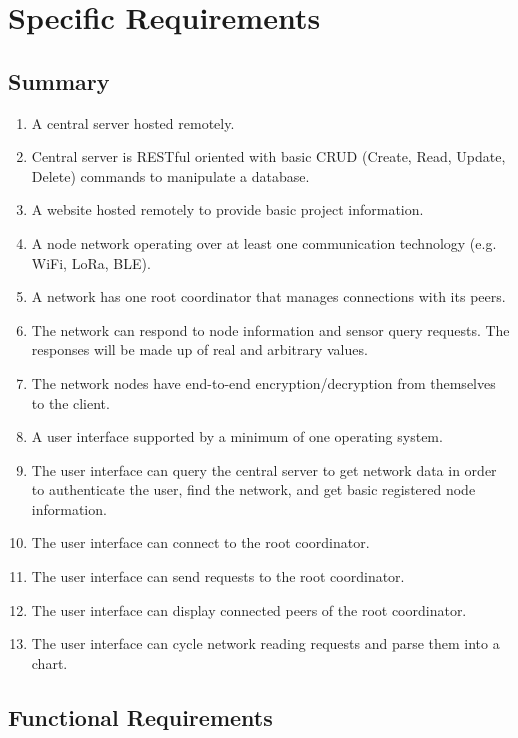 \documentclass[tikz,a4paper,titlepage]{article}
\begin{document}
\section{Specific Requirements}

\subsection{Summary}

\begin{enumerate}
    \item A central server hosted remotely.
    \item Central server is RESTful oriented with basic CRUD (Create, Read, Update, Delete) commands to manipulate a database.
    \item A website hosted remotely to provide basic project information.
    \item A node network operating over at least one communication technology (e.g. WiFi, LoRa, BLE).
    \item A network has one root coordinator that manages connections with its peers.
    \item The network can respond to node information and sensor query requests. The responses will be made up of real and arbitrary values. 
    \item The network nodes have end-to-end encryption/decryption from themselves to the client.
    \item A user interface supported by a minimum of one operating system.
    \item The user interface can query the central server to get network data in order to authenticate the user, find the network, and get basic registered node information.
    \item The user interface can connect to the root coordinator.
    \item The user interface can send requests to the root coordinator. 
    \item The user interface can display connected peers of the root coordinator. 
    \item The user interface can cycle network reading requests and parse them into a chart.
\end{enumerate}

\subsection{Functional Requirements} %
\end{document}

